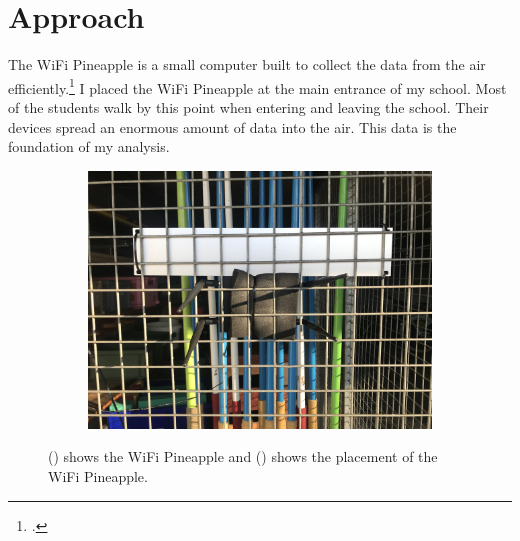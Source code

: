 \documentclass[paper=a4, fontsize=11pt]{article}
\begin{document}
\section{Approach}
The WiFi Pineapple is a small computer built to collect the data from the air efficiently.\footcite{wifipineapple}
I placed the WiFi Pineapple at the main entrance of my school. Most of the students walk by this point when entering and leaving the school. Their devices spread an enormous amount of data into the air. This data is the foundation of my analysis.

\begin{figure}[ht]
\centering
\begin{subfigure}[b]{0.45\linewidth}
\centering\includegraphics[width = 0.9\linewidth]{images/WIFIpineappleinside2.jpg}
\caption{\label{fig:WIFI-pineapple}}
\end{subfigure}
\begin{subfigure}[b]{0.45\linewidth}
\centering\caption{\label{fig:Hidden-WIFI-pineapple}}
\end{subfigure}
\caption{() shows the WiFi Pineapple and () shows the placement of the WiFi Pineapple.}
\end{figure}
\end{document}
